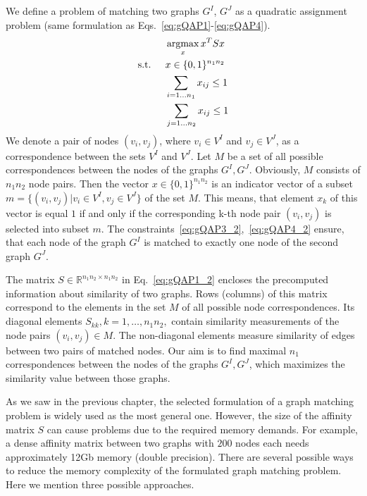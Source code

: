 We define a problem of matching two graphs $G^I$, $G^J$ as a quadratic assignment problem (same formulation as Eqs.~\eqref{eq:gQAP1}-\eqref{eq:gQAP4}). 
\begin{alignat}{2}
    &     && \mathop{\rm argmax}_x{x^TSx}                           \label{eq:gQAP1_2}\\
    & \text{s.t. } &&  x\in \{0,1\}^{n_1n_2}            \label{eq:gQAP2_2}\\
    &             &&  \sum_{i=1\dots n_1} x_{ij}\le 1   \label{eq:gQAP3_2}\\
    &             &&  \sum_{j=1\dots n_2} x_{ij}\le 1   \label{eq:gQAP4_2}
\end{alignat}
We denote a pair of nodes $(v_i,v_j)$, where $v_i\in V^I$ and $v_j\in V^J$, as a correspondence between the sets $V^I$ and $V^J$. Let $M$ be a set of all possible correspondences between the nodes of the graphs $G^I,G^J$. Obviously, $M$ consists of $n_1n_2$ node pairs.  Then the vector $x\in \{0,1\}^{n_1n_2}$ is an indicator vector of a subset $m=\{(v_i,v_j)|v_i\in V^I,v_j\in V^J\}$ of the set $M$. This means, that element $x_k$ of this vector is equal $1$ if and only if the corresponding k-th node pair $(v_i,v_j)$ is selected into subset $m$. The constraints~\eqref{eq:gQAP3_2},~\eqref{eq:gQAP4_2} ensure, that each node of the graph $G^I$ is matched to exactly one node of the second graph $G^J$.

The matrix $S\in\mathbb{R}^{n_1n_2\times n_1n_2}$ in Eq.~\eqref{eq:gQAP1_2} encloses the precomputed information about similarity of two graphs. Rows (columns) of this matrix correspond to the elements in the set $M$ of all possible node correspondences. Its diagonal elements $S_{kk},k=1,\dots,n_1n_2,$ contain similarity measurements of the node pairs $(v_i,v_j)\in M$. The non-diagonal elements measure similarity of edges between two pairs of matched nodes. Our aim is to find maximal $n_1$ correspondences between the nodes of the graphs $G^I,G^J$, which maximizes the similarity value between those graphs.

As we saw in the previous chapter, the selected formulation of a graph matching problem is widely used as the most general one. However, the size of the affinity matrix $S$ can cause problems due to the required memory demands. For example, a dense affinity matrix between two graphs with $200$ nodes each needs approximately 12Gb memory (double precision). There are several possible ways to reduce the memory complexity of the formulated graph matching problem. Here we mention three possible approaches.

